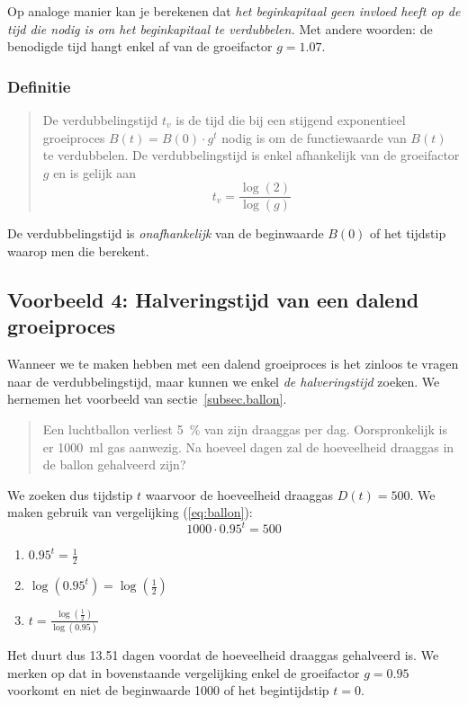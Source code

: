  Op analoge manier kan je berekenen dat \emph{het beginkapitaal geen invloed heeft op de tijd die nodig is om het beginkapitaal te verdubbelen.} Met andere woorden: de benodigde tijd hangt enkel af van de groeifactor $g=\num{1.07}$.
 
 \subsubsection{Definitie}
 \begin{quote}
 De verdubbelingstijd $t_v$ is de tijd die bij een stijgend exponentieel groeiproces $B(t)=B(0)\cdot g^t$ nodig is  om  de functiewaarde van $B(t)$ te verdubbelen.  De verdubbelingstijd is enkel afhankelijk van de groeifactor $g$ en is gelijk aan 
 \begin{displaymath}
     t_{v}=\frac{\log(2)}{\log(g)}
 \end{displaymath} 
 \end{quote}
 De verdubbelingstijd is \emph{onafhankelijk}
 van de beginwaarde $B(0)$ of het tijdstip waarop men die berekent. 



 \subsection[Dalend groeiproces: halveringstijd] {Voorbeeld 4: Halveringstijd van een dalend groeiproces}

 Wanneer we te maken hebben met een dalend groeiproces is het zinloos
 te vragen naar de verdubbelingstijd, maar kunnen we enkel \emph{de
  halveringstijd} zoeken.  We hernemen het voorbeeld van sectie~\ref{subsec.ballon}.
  \begin{quote}
  Een luchtballon verliest  \SI{5}{\percent} van zijn
 draaggas per dag. Oorspronkelijk is er \SI{1000}{\milli\litre} gas aanwezig.
     Na hoeveel dagen zal de hoeveelheid draaggas in de ballon gehalveerd zijn?
 \end{quote}
We zoeken dus tijdstip $t$ waarvoor de hoeveelheid draaggas $D(t)=500$. We maken gebruik van vergelijking (\ref{eq:ballon}):
\[
     1000\cdot \num{0.95}^{t} =  500  
     \]
     \begin{enumerate}
\item $\displaystyle      
     \num{0.95}^{t} =\frac{1}{2}$
     \addtocounter{enumi}{1}
\item $\displaystyle      
     \log(\num{0.95}^{t}) =  \log\left(\frac{1}{2}\right) $
\item $\displaystyle      
     t =  \frac{\log(\frac{1}{2})}{\log(\num{0.95})} \label{eq:th_draaggas}
$
     \end{enumerate}
     Het duurt dus  \num{13.51} dagen voordat de hoeveelheid draaggas gehalveerd is. We merken op dat in bovenstaande  vergelijking enkel de groeifactor $g=\num{0.95}$ voorkomt en niet de beginwaarde 1000 of het begintijdstip $t=0$.


